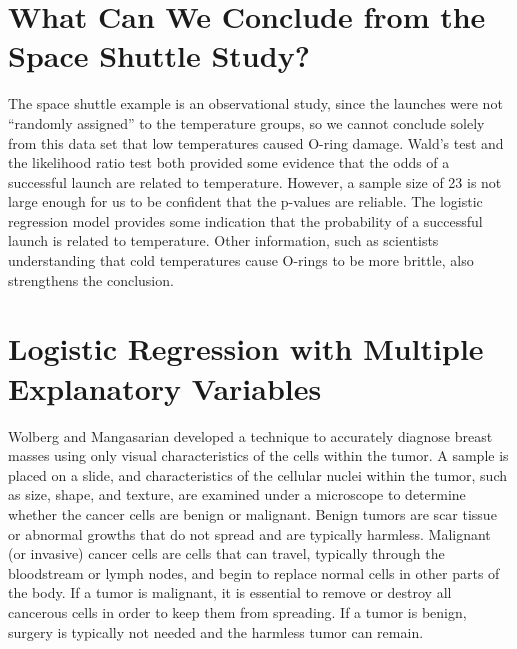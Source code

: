 \documentclass[
]{report}
\begin{document}
\hypertarget{what-can-we-conclude-from-the-space-shuttle-study}{%
\section{\texorpdfstring{\textbf{What Can We Conclude from the Space Shuttle Study?}}{What Can We Conclude from the Space Shuttle Study?}}\label{what-can-we-conclude-from-the-space-shuttle-study}}

The space shuttle example is an observational study, since the launches were not ``randomly assigned'' to the temperature groups, so we cannot conclude solely from this data set that low temperatures caused O-ring damage. Wald's test and the likelihood ratio test both provided some evidence that the odds of a successful launch are related to temperature. However, a sample size of 23 is not large enough for us to be confident that the p-values are reliable. The logistic regression model provides some indication that the probability of a successful launch is related to temperature. Other information, such as scientists understanding that cold temperatures cause O-rings to be more brittle, also strengthens the conclusion.

\hypertarget{logistic-regression-with-multiple-explanatory-variables}{%
\section{\texorpdfstring{\textbf{Logistic Regression with Multiple Explanatory Variables}}{Logistic Regression with Multiple Explanatory Variables}}\label{logistic-regression-with-multiple-explanatory-variables}}

Wolberg and Mangasarian developed a technique to accurately diagnose breast masses using only visual characteristics of the cells within the tumor. A sample is placed on a slide, and characteristics of the cellular nuclei within the tumor, such as size, shape, and texture, are examined under a microscope to determine whether the cancer cells are benign or malignant. Benign tumors are scar tissue or abnormal growths that do not spread and are typically harmless. Malignant (or invasive) cancer cells are cells that can travel, typically through the bloodstream or lymph nodes, and begin to replace normal cells in other parts of the body. If a tumor is malignant, it is essential to remove or destroy all cancerous cells in order to keep them from spreading. If a tumor is benign, surgery is typically not needed and the harmless tumor can remain.
\end{document}
